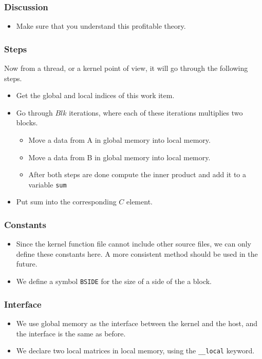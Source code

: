 \documentclass{beamer}
\begin{document}
\begin{frame}
  \frametitle{Discussion}
  \begin{itemize}
    \item Make sure that you understand this profitable theory.
  \end{itemize}
\end{frame}

\begin{frame}
  \frametitle{Steps} Now from a thread, or a kernel point of view, it
  will go through the following steps.
  \begin{itemize}
    \item Get the global and local indices of this work item.
    \item Go through $Blk$ iterations, where each of these
      iterations multiplies two blocks.
      \begin{itemize}
        \item Move a data from A in global memory into local memory.
        \item Move a data from B in global memory into local memory.
        \item After both steps are done compute the inner product and
          add it to a variable {\tt sum}
      \end{itemize}
    \item Put sum into the corresponding $C$ element.
  \end{itemize}
\end{frame}

\begin{frame}
  \frametitle{Constants}
  \begin{itemize}
    \item Since the kernel function file cannot include other source
      files, we can only define these constants here. A more
      consistent method should be used in the future.
    \item We define a symbol {\tt BSIDE} for the size of a side of the
      a block.
  \end{itemize}
\end{frame}

\begin{frame}
\end{frame}

\begin{frame}
  \frametitle{Interface}
  \begin{itemize}
    \item We use global memory as the interface between the kernel and
      the host, and the interface is the same as before.
    \item We declare two local matrices in local memory, using the
      {\tt \_\_local} keyword.
  \end{itemize}
\end{frame}
\end{document}
